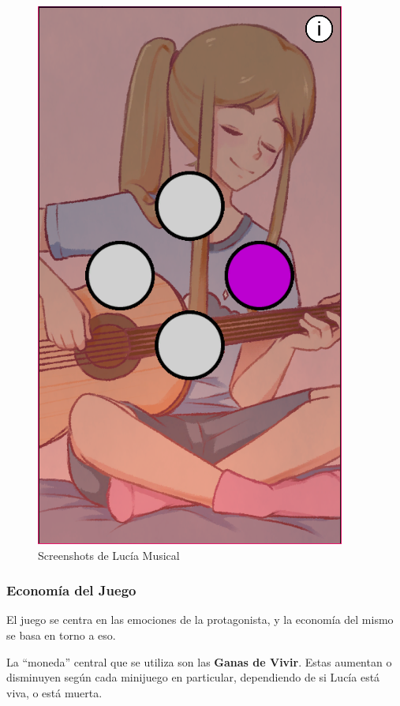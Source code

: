 \begin{figure}[h]
\begin{minipage}{0.45\textwidth}
\begin{flushright}
	   		\includegraphics[scale=.5]{imgs/screenshot14.png}
		\end{flushright}
	\end{minipage}
	\caption{Screenshots de Lucía Musical}
	\label{multifig:musica}
\end{figure}

\newpage
\subsubsection{Economía del Juego}\label{sec:economia}
El juego se centra en las emociones de la protagonista, y la economía del mismo se basa en torno a eso.

La ``moneda'' central que se utiliza son las \textbf{Ganas de Vivir}. Estas aumentan o disminuyen según cada minijuego en particular, dependiendo de si Lucía está viva, o está muerta.

